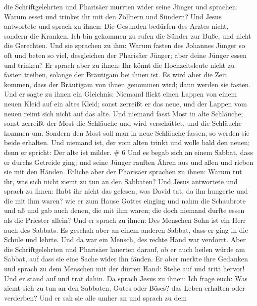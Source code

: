 die Schriftgelehrten und Pharisäer murrten wider seine Jünger und
sprachen: Warum esset und trinket ihr mit den Zöllnern und Sündern?
 Und Jesus antwortete und sprach zu ihnen: Die Gesunden
bedürfen des Arztes nicht, sondern die Kranken.  Ich bin
gekommen zu rufen die Sünder zur Buße, und nicht die Gerechten.
 Und sie sprachen zu ihm: Warum fasten des Johannes Jünger
so oft und beten so viel, desgleichen der Pharisäer Jünger; aber deine
Jünger essen und trinken?  Er sprach aber zu ihnen: Ihr
könnt die Hochzeitsleute nicht zu fasten treiben, solange der Bräutigam
bei ihnen ist.  Es wird aber die Zeit kommen, dass der
Bräutigam von ihnen genommen wird; dann werden sie fasten. 
Und er sagte zu ihnen ein Gleichnis: Niemand flickt einen Lappen von
einem neuen Kleid auf ein altes Kleid; sonst zerreißt er das neue, und
der Lappen vom neuen reimt sich nicht auf das alte.  Und
niemand fasst Most in alte Schläuche; sonst zerreißt der Most die
Schläuche und wird verschüttet, und die Schläuche kommen um.
 Sondern den Most soll man in neue Schläuche fassen, so
werden sie beide erhalten.  Und niemand ist, der vom alten
trinkt und wolle bald den neuen; denn er spricht: Der alte ist milder.
\# 6  Und es begab sich an einem Sabbat, dass er durchs
Getreide ging; und seine Jünger rauften Ähren aus und aßen und rieben
sie mit den Händen.  Etliche aber der Pharisäer sprachen zu
ihnen: Warum tut ihr, was sich nicht ziemt zu tun an den Sabbaten?
 Und Jesus antwortete und sprach zu ihnen: Habt ihr nicht
das gelesen, was David tat, da ihn hungerte und die mit ihm waren?
 wie er zum Hause Gottes einging und nahm die Schaubrote und
aß und gab auch denen, die mit ihm waren; die doch niemand durfte essen
als die Priester allein?  Und er sprach zu ihnen: Des
Menschen Sohn ist ein Herr auch des Sabbats.  Es geschah
aber an einem anderen Sabbat, dass er ging in die Schule und lehrte. Und
da war ein Mensch, des rechte Hand war verdorrt.  Aber die
Schriftgelehrten und Pharisäer lauerten darauf, ob er auch heilen würde
am Sabbat, auf dass sie eine Sache wider ihn fänden.  Er
aber merkte ihre Gedanken und sprach zu dem Menschen mit der dürren
Hand: Stehe auf und tritt hervor! Und er stand auf und trat dahin.
 Da sprach Jesus zu ihnen: Ich frage euch: Was ziemt sich zu
tun an den Sabbaten, Gutes oder Böses? das Leben erhalten oder
verderben?  Und er sah sie alle umher an und sprach zu dem
